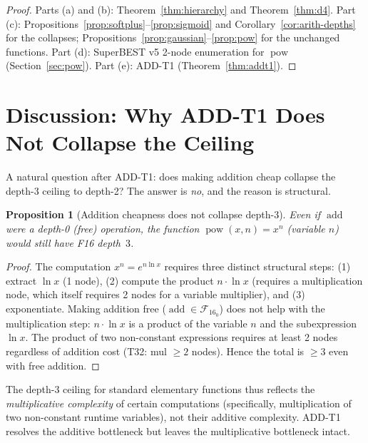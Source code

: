 \documentclass[12pt,a4paper]{article}
\newtheorem{proposition}[theorem]{Proposition}
\theoremstyle{definition}
\theoremstyle{remark}
\newcommand{\addop}{\operatorname{add}}
\newcommand{\powop}{\operatorname{pow}}
\newcommand{\F}{\mathcal{F}_{16}}
\begin{document}
\begin{proof}
Parts (a) and (b): Theorem~\ref{thm:hierarchy} and Theorem~\ref{thm:d4}.
Part (c): Propositions~\ref{prop:softplus}--\ref{prop:sigmoid} and
Corollary~\ref{cor:arith-depths} for the collapses;
Propositions~\ref{prop:gaussian}--\ref{prop:pow} for the unchanged functions.
Part (d): SuperBEST v5 2-node enumeration for $\powop$ (Section~\ref{sec:pow}).
Part (e): ADD-T1 (Theorem~\ref{thm:addt1}).
\end{proof}

\section{Discussion: Why ADD-T1 Does Not Collapse the Ceiling}
\label{sec:discussion}

A natural question after ADD-T1: does making addition cheap collapse the depth-3
ceiling to depth-2?  The answer is \emph{no}, and the reason is structural.

\begin{proposition}[Addition cheapness does not collapse depth-3]
\label{prop:noncollapse}
Even if $\addop$ were a depth-0 (free) operation, the function
$\powop(x,n) = x^n$ (variable $n$) would still have F16 depth~$3$.
\end{proposition}

\begin{proof}
The computation $x^n = e^{n\ln x}$ requires three distinct structural steps:
(1) extract $\ln x$ (1 node), (2) compute the product $n\cdot\ln x$ (requires
a multiplication node, which itself requires 2 nodes for a variable multiplier),
and (3) exponentiate.  Making addition free ($\addop \in \F_0$) does not help
with the multiplication step: $n\cdot\ln x$ is a product of the variable $n$
and the subexpression $\ln x$.  The product of two non-constant expressions
requires at least 2 nodes regardless of addition cost (T32: mul $\geq 2$ nodes).
Hence the total is $\geq 3$ even with free addition.
\end{proof}

The depth-3 ceiling for standard elementary functions thus reflects the
\emph{multiplicative complexity} of certain computations (specifically,
multiplication of two non-constant runtime variables), not their additive
complexity.  ADD-T1 resolves the additive bottleneck but leaves the
multiplicative bottleneck intact.
\end{document}
